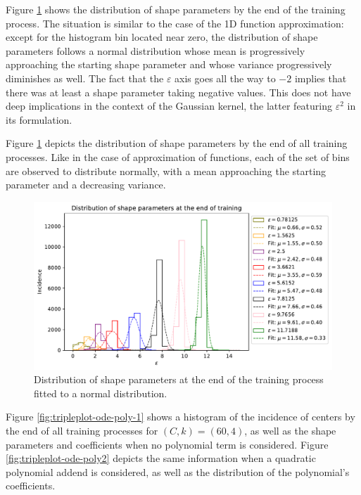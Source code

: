 \documentclass[12pt]{report} %
\begin{document}
Figure \ref{fig:ode-1d-results-shape-parameters} shows the distribution of shape parameters by the end of the training process. The situation is similar to the case of the 1D function approximation: except for the histogram bin located near zero, the distribution of shape parameters follows a normal distribution whose mean is progressively approaching the starting shape parameter and whose variance progressively diminishes as well. The fact that the $\varepsilon$ axis goes all the way to $-2$ implies that there was at least a shape parameter taking negative values. This does not have deep implications in the context of the Gaussian kernel, the latter featuring $\varepsilon^2$ in its formulation.

Figure \ref{fig:ode-1d-results-shape-parameters} depicts the distribution of shape parameters by the end of all training processes. Like in the case of approximation of functions, each of the set of bins are observed to distribute normally, with a mean approaching the starting parameter and a decreasing variance.

\begin{figure}[h]
  \includegraphics[width=\textwidth]{imagenes/experiments/1d/ode/distribution_of_shape_parameters_at_end_of_training.pdf}
  \caption{Distribution of shape parameters at the end of the training process fitted to a normal distribution.}
  \label{fig:ode-1d-results-shape-parameters}
\end{figure}

Figure \ref{fig:tripleplot-ode-poly-1} shows a histogram of the incidence of centers by the end of all training processes for $(C,k)=(60,4)$, as well as the shape parameters and coefficients when no polynomial term is considered. Figure \ref{fig:tripleplot-ode-poly2} depicts the same information when a quadratic polynomial addend is considered, as well as the distribution of the polynomial's coefficients. 
\end{document}

